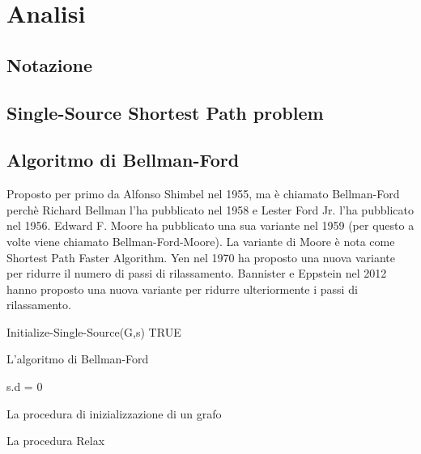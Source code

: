 \documentclass{article}
\begin{document}
	\section{Analisi}
	\label{section:analisi}
	\subsection{Notazione}
	\subsection{Single-Source Shortest Path problem}
	\subsection{Algoritmo di Bellman-Ford}
	Proposto per primo da Alfonso Shimbel nel 1955, ma è chiamato Bellman-Ford perchè Richard Bellman l'ha pubblicato nel 1958 e Lester Ford Jr. l'ha pubblicato nel 1956. Edward F. Moore ha pubblicato una sua variante nel 1959 (per questo a volte viene chiamato Bellman-Ford-Moore). La variante di Moore è nota come Shortest Path Faster Algorithm. Yen nel 1970 ha proposto una nuova variante per ridurre il numero di passi di rilassamento. Bannister e Eppstein nel 2012 hanno proposto una nuova variante per ridurre ulteriormente i passi di rilassamento.
	
	\begin{algorithm}[H]
		Initialize-Single-Source(G,s)\;
		\Return TRUE\;
		\caption{L'algoritmo di Bellman-Ford}
	\end{algorithm}

	\begin{algorithm}[H]
		s.d = 0\;
		\caption{La procedura di inizializzazione di un grafo}
	\end{algorithm}

	\begin{algorithm}[H]
		\caption{La procedura Relax}
	\end{algorithm}
	
\end{document}
